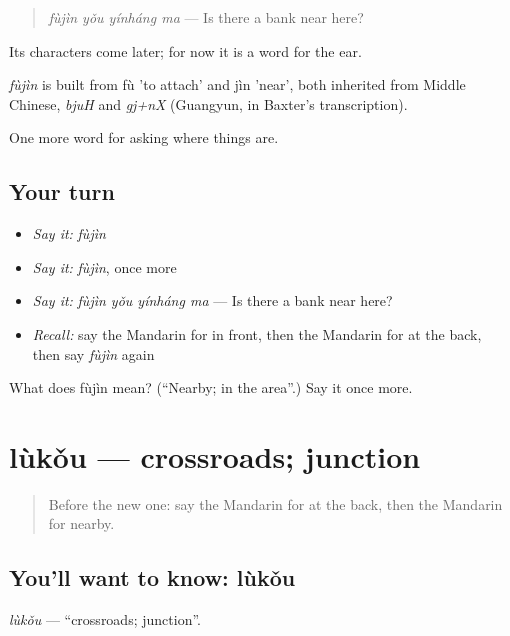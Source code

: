 \begin{quote}
\emph{fùjìn yǒu yínháng ma} — Is there a bank near here?
\end{quote}

Its characters come later; for now it is a word for the ear.

\begin{cousinweb}
\emph{fùjìn} is built from fù 'to attach' and jìn 'near', both inherited from Middle Chinese, \emph{bjuH} and \emph{gj+nX} (Guangyun, in Baxter's transcription).
\end{cousinweb}

\begin{grammarlens}[title={What you've built}]
One more word for asking where things are.
\end{grammarlens}

\subsection*{Your turn}
\begin{itemize}
\raggedright
  \item \emph{Say it:} \emph{fùjìn}
  \item \emph{Say it:} \emph{fùjìn}, once more
  \item \emph{Say it:} \emph{fùjìn yǒu yínháng ma} — Is there a bank near here?
  \item \emph{Recall:} say the Mandarin for in front, then the Mandarin for at the back, then say \emph{fùjìn} again
\end{itemize}

\begin{tcolorbox}[breakable,colback=teal!4,colframe=teal!35!black,title={Before you move on}]
What does fùjìn mean? (\textquotedblleft{}Nearby; in the area\textquotedblright{}.) Say it once more.
\end{tcolorbox}
\section[lùkǒu]{lùkǒu — crossroads; junction}

\label{lesson:ZH-C111-lukou}



\begin{quote}
Before the new one: say the Mandarin for at the back, then the Mandarin for nearby.
\end{quote}

\subsection*{You'll want to know: lùkǒu}
\emph{lùkǒu} — \textquotedblleft{}crossroads; junction\textquotedblright{}.

